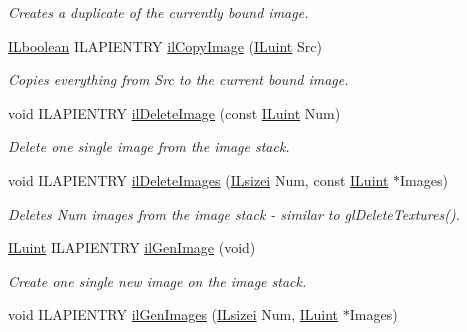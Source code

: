 \begin{DoxyCompactItemize}
\begin{DoxyCompactList}\small\item\em Creates a duplicate of the currently bound image. \end{DoxyCompactList}\item 
\hyperlink{group__il__types_gaa6aa7c95cfdc06b4d8601ef832b7bb0a}{I\+Lboolean} I\+L\+A\+P\+I\+E\+N\+T\+R\+Y \hyperlink{group__image__mgt_gaf0f3ef5b949468a12a4b49e0fb2cb3cb}{il\+Copy\+Image} (\hyperlink{group__il__types_gaff8e86a1072c8d7cfe387fb87c6ed8e1}{I\+Luint} Src)
\begin{DoxyCompactList}\small\item\em Copies everything from Src to the current bound image. \end{DoxyCompactList}\item 
\hypertarget{group__image__mgt_ga74c70352949963d2b30c919662a65844}{void I\+L\+A\+P\+I\+E\+N\+T\+R\+Y \hyperlink{group__image__mgt_ga74c70352949963d2b30c919662a65844}{il\+Delete\+Image} (const \hyperlink{group__il__types_gaff8e86a1072c8d7cfe387fb87c6ed8e1}{I\+Luint} Num)}\label{group__image__mgt_ga74c70352949963d2b30c919662a65844}

\begin{DoxyCompactList}\small\item\em Delete one single image from the image stack. \end{DoxyCompactList}\item 
\hypertarget{group__image__mgt_gab4346d371243537a7050e255f99c8b16}{void I\+L\+A\+P\+I\+E\+N\+T\+R\+Y \hyperlink{group__image__mgt_gab4346d371243537a7050e255f99c8b16}{il\+Delete\+Images} (\hyperlink{group__il__types_gad51812c5d3fd67d85973dd7a7cb80d8e}{I\+Lsizei} Num, const \hyperlink{group__il__types_gaff8e86a1072c8d7cfe387fb87c6ed8e1}{I\+Luint} $\ast$Images)}\label{group__image__mgt_gab4346d371243537a7050e255f99c8b16}

\begin{DoxyCompactList}\small\item\em Deletes Num images from the image stack -\/ similar to gl\+Delete\+Textures(). \end{DoxyCompactList}\item 
\hypertarget{group__image__mgt_ga056ebbb4dc5b18e027c555fcf39bd3c4}{\hyperlink{group__il__types_gaff8e86a1072c8d7cfe387fb87c6ed8e1}{I\+Luint} I\+L\+A\+P\+I\+E\+N\+T\+R\+Y \hyperlink{group__image__mgt_ga056ebbb4dc5b18e027c555fcf39bd3c4}{il\+Gen\+Image} (void)}\label{group__image__mgt_ga056ebbb4dc5b18e027c555fcf39bd3c4}

\begin{DoxyCompactList}\small\item\em Create one single new image on the image stack. \end{DoxyCompactList}\item 
\hypertarget{group__image__mgt_ga2bd61fd22ff429363d44a4eaff3b064d}{void I\+L\+A\+P\+I\+E\+N\+T\+R\+Y \hyperlink{group__image__mgt_ga2bd61fd22ff429363d44a4eaff3b064d}{il\+Gen\+Images} (\hyperlink{group__il__types_gad51812c5d3fd67d85973dd7a7cb80d8e}{I\+Lsizei} Num, \hyperlink{group__il__types_gaff8e86a1072c8d7cfe387fb87c6ed8e1}{I\+Luint} $\ast$Images)}\label{group__image__mgt_ga2bd61fd22ff429363d44a4eaff3b064d}


\end{DoxyCompactItemize}
